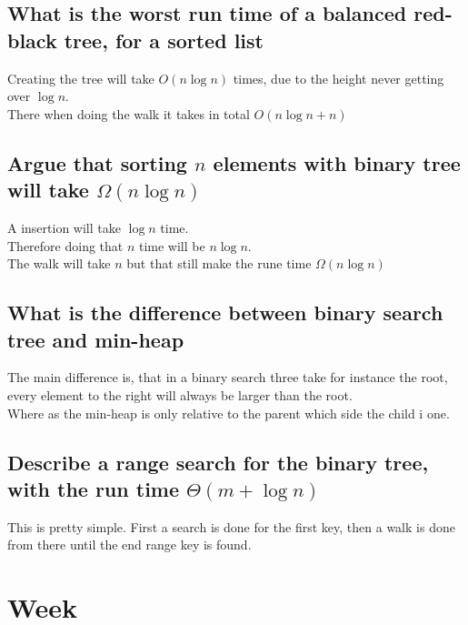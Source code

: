 \documentclass[12pt, a4paper]{article}
\begin{document}
			\subsection{What is the worst run time of a balanced red-black tree, for a sorted list}
				Creating the tree will take $O(n\log n)$ times, due to the height never getting over $\log n$.\\
				There when doing the walk it takes in total $O(n\log n + n)$
			\subsection{Argue that sorting $n$ elements with binary tree will take $\Omega(n\log n)$}
				A insertion will take $\log n$ time.\\
				Therefore doing that $n$ time will be $n\log n$.\\
				The walk will take $n$ but that still make the rune time $\Omega(n\log n)$
			\subsection{What is the difference between binary search tree and min-heap}
				The main difference is, that in a binary search three take for instance the root, every element to the right will always be larger than the root.\\
				Where as the min-heap is only relative to the parent which side the child i one.
			\subsection{Describe a range search for the binary tree, with the run time $\Theta(m+\log n)$}
				This is pretty simple. First a search is done for the first key, then a walk is done from there until the end range key is found.
		\section{Week}
\end{document}
